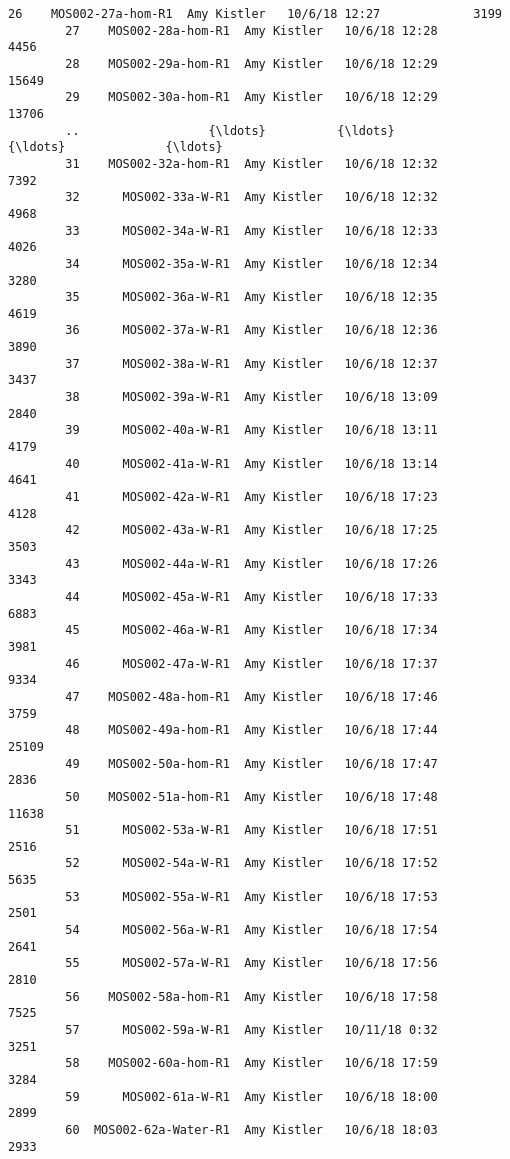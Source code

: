 \documentclass[11pt]{article}
\begin{document}
\begin{Verbatim}[commandchars=\\\{\}]
        26    MOS002-27a-hom-R1  Amy Kistler   10/6/18 12:27             3199   
        27    MOS002-28a-hom-R1  Amy Kistler   10/6/18 12:28             4456   
        28    MOS002-29a-hom-R1  Amy Kistler   10/6/18 12:29            15649   
        29    MOS002-30a-hom-R1  Amy Kistler   10/6/18 12:29            13706   
        ..                  {\ldots}          {\ldots}             {\ldots}              {\ldots}   
        31    MOS002-32a-hom-R1  Amy Kistler   10/6/18 12:32             7392   
        32      MOS002-33a-W-R1  Amy Kistler   10/6/18 12:32             4968   
        33      MOS002-34a-W-R1  Amy Kistler   10/6/18 12:33             4026   
        34      MOS002-35a-W-R1  Amy Kistler   10/6/18 12:34             3280   
        35      MOS002-36a-W-R1  Amy Kistler   10/6/18 12:35             4619   
        36      MOS002-37a-W-R1  Amy Kistler   10/6/18 12:36             3890   
        37      MOS002-38a-W-R1  Amy Kistler   10/6/18 12:37             3437   
        38      MOS002-39a-W-R1  Amy Kistler   10/6/18 13:09             2840   
        39      MOS002-40a-W-R1  Amy Kistler   10/6/18 13:11             4179   
        40      MOS002-41a-W-R1  Amy Kistler   10/6/18 13:14             4641   
        41      MOS002-42a-W-R1  Amy Kistler   10/6/18 17:23             4128   
        42      MOS002-43a-W-R1  Amy Kistler   10/6/18 17:25             3503   
        43      MOS002-44a-W-R1  Amy Kistler   10/6/18 17:26             3343   
        44      MOS002-45a-W-R1  Amy Kistler   10/6/18 17:33             6883   
        45      MOS002-46a-W-R1  Amy Kistler   10/6/18 17:34             3981   
        46      MOS002-47a-W-R1  Amy Kistler   10/6/18 17:37             9334   
        47    MOS002-48a-hom-R1  Amy Kistler   10/6/18 17:46             3759   
        48    MOS002-49a-hom-R1  Amy Kistler   10/6/18 17:44            25109   
        49    MOS002-50a-hom-R1  Amy Kistler   10/6/18 17:47             2836   
        50    MOS002-51a-hom-R1  Amy Kistler   10/6/18 17:48            11638   
        51      MOS002-53a-W-R1  Amy Kistler   10/6/18 17:51             2516   
        52      MOS002-54a-W-R1  Amy Kistler   10/6/18 17:52             5635   
        53      MOS002-55a-W-R1  Amy Kistler   10/6/18 17:53             2501   
        54      MOS002-56a-W-R1  Amy Kistler   10/6/18 17:54             2641   
        55      MOS002-57a-W-R1  Amy Kistler   10/6/18 17:56             2810   
        56    MOS002-58a-hom-R1  Amy Kistler   10/6/18 17:58             7525   
        57      MOS002-59a-W-R1  Amy Kistler   10/11/18 0:32             3251   
        58    MOS002-60a-hom-R1  Amy Kistler   10/6/18 17:59             3284   
        59      MOS002-61a-W-R1  Amy Kistler   10/6/18 18:00             2899   
        60  MOS002-62a-Water-R1  Amy Kistler   10/6/18 18:03             2933   
        

\end{Verbatim}
\end{document}
